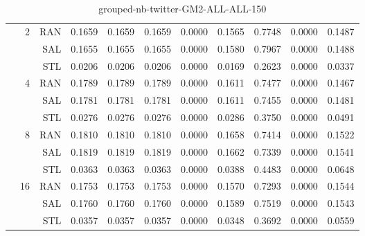 \begin{center}
\begin{table}[htbp]
\begin{center}
\begin{tabular}{ | r | r | r | r | r | r | r | r | r | r | r |}
 & \multirow{3}{*}{2} & RAN & 0.1659 & 0.1659 & 0.1659 & 0.0000 & 0.1565 & 0.7748 & 0.0000 & 0.1487\\ \cline{3-11}
 &   & SAL & 0.1655 & 0.1655 & 0.1655 & 0.0000 & 0.1580 & 0.7967 & 0.0000 & 0.1488\\ \cline{3-11}
 &   & STL & 0.0206 & 0.0206 & 0.0206 & 0.0000 & 0.0169 & 0.2623 & 0.0000 & 0.0337\\ \cline{2-11}
 & \multirow{3}{*}{4} & RAN & 0.1789 & 0.1789 & 0.1789 & 0.0000 & 0.1611 & 0.7477 & 0.0000 & 0.1467\\ \cline{3-11}
 &   & SAL & 0.1781 & 0.1781 & 0.1781 & 0.0000 & 0.1611 & 0.7455 & 0.0000 & 0.1481\\ \cline{3-11}
 &   & STL & 0.0276 & 0.0276 & 0.0276 & 0.0000 & 0.0286 & 0.3750 & 0.0000 & 0.0491\\ \cline{2-11}
 & \multirow{3}{*}{8} & RAN & 0.1810 & 0.1810 & 0.1810 & 0.0000 & 0.1658 & 0.7414 & 0.0000 & 0.1522\\ \cline{3-11}
 &   & SAL & 0.1819 & 0.1819 & 0.1819 & 0.0000 & 0.1662 & 0.7339 & 0.0000 & 0.1541\\ \cline{3-11}
 &   & STL & 0.0363 & 0.0363 & 0.0363 & 0.0000 & 0.0388 & 0.4483 & 0.0000 & 0.0648\\ \cline{2-11}
 & \multirow{3}{*}{16} & RAN & 0.1753 & 0.1753 & 0.1753 & 0.0000 & 0.1570 & 0.7293 & 0.0000 & 0.1544\\ \cline{3-11}
 &   & SAL & 0.1760 & 0.1760 & 0.1760 & 0.0000 & 0.1589 & 0.7519 & 0.0000 & 0.1543\\ \cline{3-11}
 &   & STL & 0.0357 & 0.0357 & 0.0357 & 0.0000 & 0.0348 & 0.3692 & 0.0000 & 0.0559\\ \cline{2-11}
\hline
\end{tabular}
\caption{grouped-nb-twitter-GM2-ALL-ALL-150}
\end{center}
 \end{table}
\end{center}

